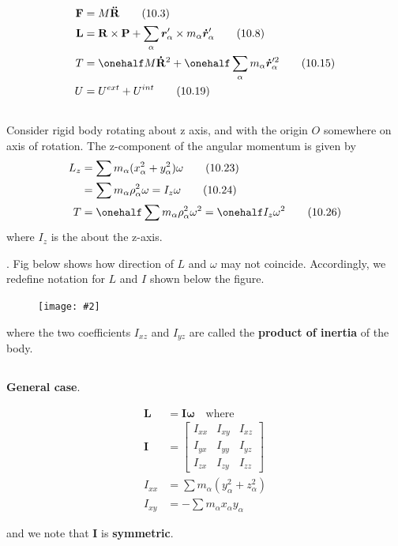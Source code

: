 \documentclass[10pt, twocolumn]{article}
\DeclareRobustCommand{\mybox}[2][gray!20]{%
	\begin{tcolorbox}[   %
		breakable,
		left=0pt,
		right=0pt,
		top=-13pt,
		bottom=0pt,
		colback=#1,
		colframe=#1,
		width=0.45\dimexpr\textwidth\relax,
		enlarge left by=0mm,
		boxsep=1pt,
		arc=0pt,outer arc=0pt,
		]
		#2
	\end{tcolorbox}
}
\newcommand\graybox[1]{ \mybox[gray!20]{\begin{align}#1\end{align}} }
\newcommand\myfig[2][0.3\textwidth]{\begin{figure}[h!]\centering\texttt{[image: \#2]}\end{figure}}
\newcommand{\myspace}{\vspace{3\bigskipamount}}
\newcommand\p{\Needspace{10\baselineskip} \noindent}
\newcommand\tlab[1]{\tag{#1}\label{#1}}
\begin{document}
\graybox{
	\mathbf F &= M \mathbf{\ddot R}	 \tlab{10.3} \\
	\mathbf L &= \mathbf R \times \mathbf P 
				+ \sum_\alpha \bm{r}'_\alpha \times m_\alpha \bm{\dot r}'_\alpha \tlab{10.8} \\
	T &= \onehalf M \mathbf{\dot R}^2 + \onehalf \sum_{\alpha} m_\alpha \bm{\dot r}_\alpha^{\prime 2} \tlab{10.15} \\
	U &= U^{ext} + U^{int} \tlab{10.19}
	}
	
\myspace
\subsection{}

\p Consider rigid body rotating about z axis, and with the origin $O$ somewhere on axis of rotation. The z-component of the angular momentum is given by
\begin{align}
L_z &= \sum m_\alpha (x_\alpha^2 + y_\alpha^2) \omega  \tlab{10.23} \\
&= \sum m_\alpha \rho_\alpha^2 \omega = I_z \omega \tlab{10.24} \\
T &= \onehalf \sum m_\alpha \rho_\alpha^2 \omega^2 = \onehalf I_z \omega^2 \tlab{10.26}
\end{align}
where $I_z$ is the  about the z-axis. 

\myspace 
\p {}. Fig below shows how direction of $L$ and $\omega$ may not coincide. Accordingly, we redefine notation for $L$ and $I$ shown below the figure.
\myfig[0.2\textwidth]{MomInert.PNG}

\p where the two coefficients $I_{xz}$ and $I_{yz}$ are called the \textbf{product of inertia} of the body. 

\myspace{}
\subsection{}

\p \textbf{General case}. 
\graybox{
	\mathbf{L} &= \mathbf{I} \bm{\omega} \quad \text{where} \tlab{10.42} \\
	\mathbf{I} &= 
	\begin{bmatrix}
		I_{xx} & I_{xy} & I_{xz} \\
		I_{yx} & I_{yy} & I_{yz} \\
		I_{zx} & I_{zy} & I_{zz} 
	\end{bmatrix}\\
	I_{xx} &= \sum m_\alpha  ( y_\alpha^2 + z_\alpha^2)  \tlab{10.37} \\
	I_{xy} &= -\sum m_\alpha x_\alpha y_\alpha 	\tlab{10.38}
}
and we note that $\mathbf{I}$ is \textbf{symmetric}. 
\end{document}
